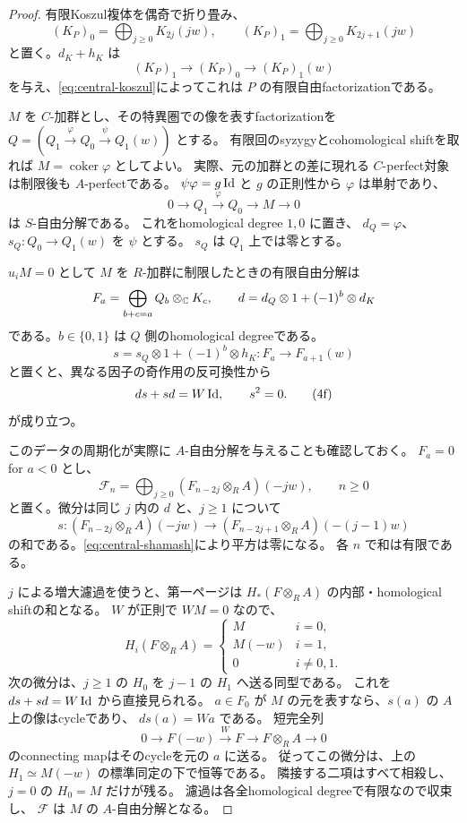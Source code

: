 \begin{proof}
 有限Koszul複体を偶奇で折り畳み、
 \[
 (K_P)_0=\bigoplus_{j\ge0}K_{2j}(jw),\qquad
 (K_P)_1=\bigoplus_{j\ge0}K_{2j+1}(jw)
 \]
 と置く。\(d_K+h_K\) は
 \[
 (K_P)_1\longrightarrow(K_P)_0
             \longrightarrow(K_P)_1(w)
 \]
 を与え、\eqref{eq:central-koszul}によってこれは \(P\) の有限自由factorizationである。

 \(M\) を \(C\)-加群とし、その特異圏での像を表すfactorizationを
 \(Q=(Q_1\xrightarrow\varphi Q_0\xrightarrow\psi Q_1(w))\) とする。
 有限回のsyzygyとcohomological shiftを取れば
 \(M=\operatorname{coker}\varphi\) としてよい。
 実際、元の加群との差に現れる \(C\)-perfect対象は制限後も \(A\)-perfectである。
 \(\psi\varphi=g\operatorname{Id}\) と \(g\) の正則性から \(\varphi\) は単射であり、
 \[
 0\longrightarrow Q_1\xrightarrow\varphi Q_0\longrightarrow M\longrightarrow0
 \]
 は \(S\)-自由分解である。
 これをhomological degree \(1,0\) に置き、
 \(d_Q=\varphi\)、\(s_Q:Q_0\to Q_1(w)\) を \(\psi\) とする。
 \(s_Q\) は \(Q_1\) 上では零とする。

 \(u_iM=0\) として \(M\) を \(R\)-加群に制限したときの有限自由分解は
 \[
 F_a=\bigoplus_{b+c=a}Q_b\otimes_\mathbb C K_c,
 \qquad d=d_Q\otimes1+(-1)^b\otimes d_K
 \]
 である。\(b\in\{0,1\}\) は \(Q\) 側のhomological degreeである。
 \[
 s=s_Q\otimes1+(-1)^b\otimes h_K:F_a\longrightarrow F_{a+1}(w)
 \]
 と置くと、異なる因子の奇作用の反可換性から
 \[
 ds+sd=W\operatorname{Id},\qquad s^2=0.                                  \tag{4f}\label{eq:central-shamash}
 \]
 が成り立つ。

 このデータの周期化が実際に \(A\)-自由分解を与えることも確認しておく。
 \(F_a=0\) for \(a<0\) とし、
 \[
 \mathcal F_n=
 \bigoplus_{j\ge0}(F_{n-2j}\otimes_R A)(-jw),\qquad n\ge0
 \]
 と置く。微分は同じ \(j\) 内の \(d\) と、\(j\ge1\) について
 \[
 s:(F_{n-2j}\otimes_R A)(-jw)
 \longrightarrow(F_{n-2j+1}\otimes_R A)(-(j-1)w)
 \]
 の和である。\eqref{eq:central-shamash}により平方は零になる。
 各 \(n\) で和は有限である。

 \(j\) による増大濾過を使うと、第一ページは
 \(H_*(F\otimes_R A)\) の内部・homological shiftの和となる。
 \(W\) が正則で \(WM=0\) なので、
 \[
 H_i(F\otimes_R A)=
 \begin{cases}
 M&i=0,\\
 M(-w)&i=1,\\
 0&i\ne0,1.
 \end{cases}
 \]
 次の微分は、\(j\ge1\) の \(H_0\) を \(j-1\) の \(H_1\) へ送る同型である。
 これを \(ds+sd=W\operatorname{Id}\) から直接見られる。
 \(a\in F_0\) が \(M\) の元を表すなら、\(s(a)\) の \(A\) 上の像はcycleであり、
 \(d s(a)=Wa\) である。
 短完全列
 \[
 0\longrightarrow F(-w)\xrightarrow{W}F
      \longrightarrow F\otimes_R A\longrightarrow0
 \]
 のconnecting mapはそのcycleを元の \(a\) に送る。
 従ってこの微分は、上の \(H_1\simeq M(-w)\) の標準同定の下で恒等である。
 隣接する二項はすべて相殺し、\(j=0\) の \(H_0=M\) だけが残る。
 濾過は各全homological degreeで有限なので収束し、
 \(\mathcal F\) は \(M\) の \(A\)-自由分解となる。


\end{proof}
